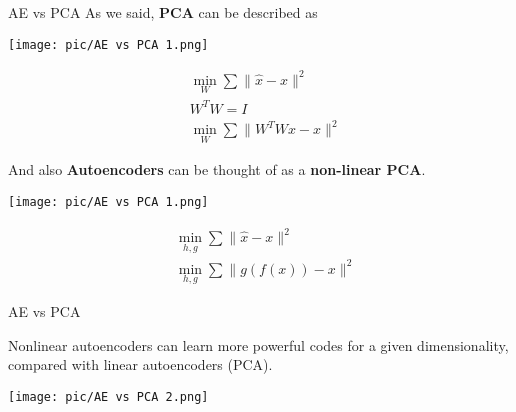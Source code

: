 \documentclass[serif, aspectratio=169]{beamer}
\begin{document}
\begin{frame}{AE vs PCA}
    As we said, \textbf{PCA} can be described as
    \begin{center}
        \begin{minipage}{0.6\textwidth}
            \begin{center}
                \texttt{[image: pic/AE vs PCA 1.png]}
            \end{center}
        \end{minipage}
        \hfill
        \begin{minipage}{0.35\textwidth}
            \begin{align*}
                &\min_{W} \sum \| \hat{x} - x \|^2 \\
                &W^T W = I \\
                &\min_{W} \sum \| W^T W x - x \|^2
            \end{align*}
        \end{minipage}
        
        \vspace{0.3cm}
    \end{center}
    And also \textbf{Autoencoders} can be thought of as a \textbf{non-linear PCA}.
    \begin{center}                
        \begin{minipage}{0.6\textwidth}
            \begin{center}
                \texttt{[image: pic/AE vs PCA 1.png]} 
            \end{center}
        \end{minipage}
        \hfill
        \begin{minipage}{0.35\textwidth}
            \begin{align*}
                &\min_{h, g} \sum \| \hat{x} - x \|^2 \\
                &\min_{h, g} \sum \| g(f(x)) - x \|^2
            \end{align*}
        \end{minipage}
    \end{center}
\end{frame}

\begin{frame}{AE vs PCA}

    Nonlinear autoencoders can learn more powerful codes for a given dimensionality, compared with linear autoencoders (PCA).
    
    
    \begin{center}
        \texttt{[image: pic/AE vs PCA 2.png]} 
    \end{center}
\end{frame}
\end{document}
